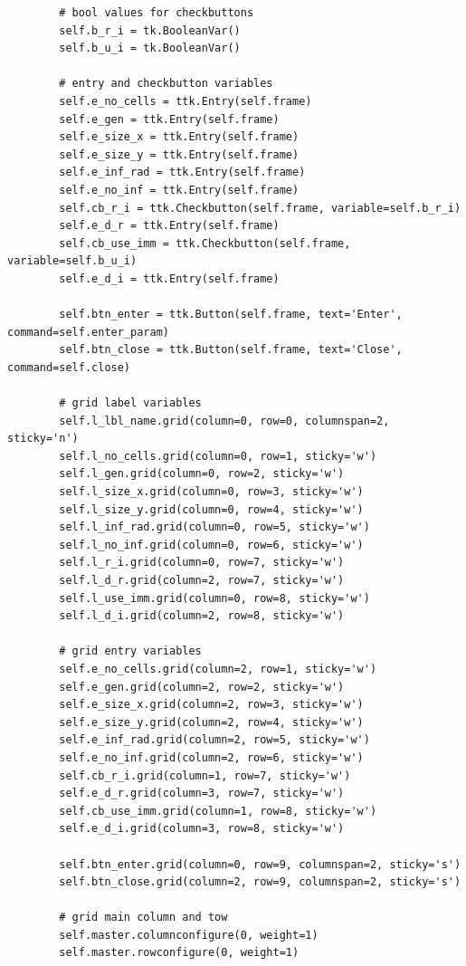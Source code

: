 \documentclass[11pt, a4paper]{article}
\begin{document}
\begin{lstlisting}
        # bool values for checkbuttons
        self.b_r_i = tk.BooleanVar()
        self.b_u_i = tk.BooleanVar()

        # entry and checkbutton variables
        self.e_no_cells = ttk.Entry(self.frame)
        self.e_gen = ttk.Entry(self.frame)
        self.e_size_x = ttk.Entry(self.frame)
        self.e_size_y = ttk.Entry(self.frame)
        self.e_inf_rad = ttk.Entry(self.frame)
        self.e_no_inf = ttk.Entry(self.frame)
        self.cb_r_i = ttk.Checkbutton(self.frame, variable=self.b_r_i)
        self.e_d_r = ttk.Entry(self.frame)
        self.cb_use_imm = ttk.Checkbutton(self.frame, variable=self.b_u_i)
        self.e_d_i = ttk.Entry(self.frame)

        self.btn_enter = ttk.Button(self.frame, text='Enter', command=self.enter_param)
        self.btn_close = ttk.Button(self.frame, text='Close', command=self.close)

        # grid label variables
        self.l_lbl_name.grid(column=0, row=0, columnspan=2, sticky='n')
        self.l_no_cells.grid(column=0, row=1, sticky='w')
        self.l_gen.grid(column=0, row=2, sticky='w')
        self.l_size_x.grid(column=0, row=3, sticky='w')
        self.l_size_y.grid(column=0, row=4, sticky='w')
        self.l_inf_rad.grid(column=0, row=5, sticky='w')
        self.l_no_inf.grid(column=0, row=6, sticky='w')
        self.l_r_i.grid(column=0, row=7, sticky='w')
        self.l_d_r.grid(column=2, row=7, sticky='w')
        self.l_use_imm.grid(column=0, row=8, sticky='w')
        self.l_d_i.grid(column=2, row=8, sticky='w')

        # grid entry variables
        self.e_no_cells.grid(column=2, row=1, sticky='w')
        self.e_gen.grid(column=2, row=2, sticky='w')
        self.e_size_x.grid(column=2, row=3, sticky='w')
        self.e_size_y.grid(column=2, row=4, sticky='w')
        self.e_inf_rad.grid(column=2, row=5, sticky='w')
        self.e_no_inf.grid(column=2, row=6, sticky='w')
        self.cb_r_i.grid(column=1, row=7, sticky='w')
        self.e_d_r.grid(column=3, row=7, sticky='w')
        self.cb_use_imm.grid(column=1, row=8, sticky='w')
        self.e_d_i.grid(column=3, row=8, sticky='w')

        self.btn_enter.grid(column=0, row=9, columnspan=2, sticky='s')
        self.btn_close.grid(column=2, row=9, columnspan=2, sticky='s')

        # grid main column and tow
        self.master.columnconfigure(0, weight=1)
        self.master.rowconfigure(0, weight=1)


\end{lstlisting}
\end{document}
